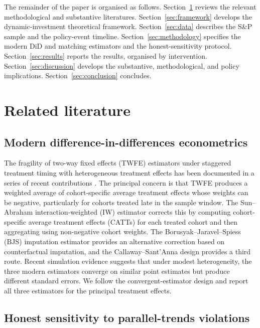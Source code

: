 \documentclass[12pt,a4paper]{article}
\theoremstyle{plain}
\theoremstyle{definition}
\begin{document}
The remainder of the paper is organised as follows. Section~\ref{sec:literature} reviews the relevant methodological and substantive literatures. Section~\ref{sec:framework} develops the dynamic-investment theoretical framework. Section~\ref{sec:data} describes the S\&P sample and the policy-event timeline. Section~\ref{sec:methodology} specifies the modern DiD and matching estimators and the honest-sensitivity protocol. Section~\ref{sec:results} reports the results, organised by intervention. Section~\ref{sec:discussion} develops the substantive, methodological, and policy implications. Section~\ref{sec:conclusion} concludes.

\section{Related literature}
\label{sec:literature}

\subsection{Modern difference-in-differences econometrics}
\label{sec:lit-did}

The fragility of two-way fixed effects (TWFE) estimators under staggered treatment timing with heterogeneous treatment effects has been documented in a series of recent contributions \cite{goodman2021difference, dechaisemartin2020twoway, callaway2021difference, sun2021estimating, borusyak2024revisiting}. The principal concern is that TWFE produces a weighted average of cohort-specific average treatment effects whose weights can be negative, particularly for cohorts treated late in the sample window. The Sun--Abraham interaction-weighted (IW) estimator \cite{sun2021estimating} corrects this by computing cohort-specific average treatment effects (CATTs) for each treated cohort and then aggregating using non-negative cohort weights. The Borusyak--Jaravel--Spiess (BJS) imputation estimator \cite{borusyak2024revisiting} provides an alternative correction based on counterfactual imputation, and the Callaway--Sant'Anna design \cite{callaway2021difference} provides a third route. Recent simulation evidence \cite{baker2022how, dube2022what} suggests that under modest heterogeneity, the three modern estimators converge on similar point estimates but produce different standard errors. We follow the convergent-estimator design and report all three estimators for the principal treatment effects.

\subsection{Honest sensitivity to parallel-trends violations}
\label{sec:lit-rr}
\end{document}
